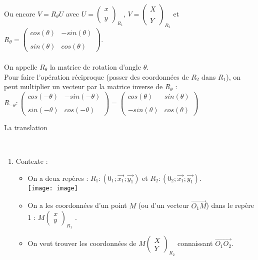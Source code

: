 \documentclass[11]{article}
\newcommand\coordo[2]{\begin{pmatrix} #1 \\#2 \end{pmatrix}}
\begin{document}
\begin{enumerate}
\begin{enumerate}
Ou encore $V=R_{\theta}U$ avec $U = \begin{pmatrix} x \\ \\ y\end{pmatrix}_{R_1}$, $V = \begin{pmatrix} X \\ \\ Y \end{pmatrix}_{R_2}$ et $R_{\theta} = \begin{pmatrix}
cos(\theta) & -sin(\theta) \\ \\
sin(\theta) & cos(\theta)
\end{pmatrix} $. \\ \\

On appelle $R_{\theta}$ la matrice de rotation d'angle $\theta$. \\

Pour faire l'opération réciproque (passer des coordonnées de $R_2$ dans $R_1$), on peut multiplier un vecteur par la matrice inverse de $R_{\theta}$ : $R_{-\theta} : \begin{pmatrix}
cos(-\theta) & -sin(-\theta) \\ \\
sin(-\theta) & cos(-\theta)
\end{pmatrix} = \begin{pmatrix}
cos(\theta) & sin(\theta) \\ \\
-sin(\theta) & cos(\theta)
\end{pmatrix}$

\end{enumerate}

\newpage

\begin{Large} \item La translation \end{Large} \\
\begin{enumerate}
\item Contexte : 
\begin{itemize}
\item On a deux repères : $R_1:(0_1;\overrightarrow{x_1};\overrightarrow{y_1})$ et $R_2:(0_2;\overrightarrow{x_1};\overrightarrow{y_1})$. \\
\texttt{[image: image]}
\item On a les coordonnées d'un point $M$ (ou d'un vecteur $\overrightarrow{O_1M}$) dans le repère 1 :  $M\coordo{x}{y}_{R_1}$ .
\item On veut trouver les coordonnées de $M\coordo{X}{Y}_{R_2}$  connaissant  $\overrightarrow{O_1O_2}$.
\end{itemize}


\end{enumerate}
\end{enumerate}
\end{document}
